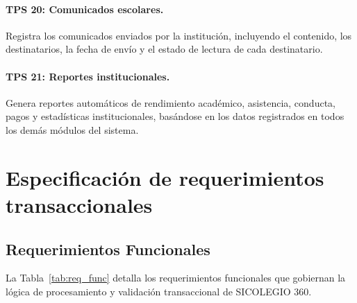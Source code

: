 \documentclass[12pt,a4paper,oneside]{report}
\begin{document}
\paragraph{TPS 20: Comunicados escolares.} Registra los comunicados enviados por la institución, incluyendo el contenido, los destinatarios, la fecha de envío y el estado de lectura de cada destinatario.

\paragraph{TPS 21: Reportes institucionales.} Genera reportes automáticos de rendimiento académico, asistencia, conducta, pagos y estadísticas institucionales, basándose en los datos registrados en todos los demás módulos del sistema.

\section{Especificación de requerimientos transaccionales}

\subsection{Requerimientos Funcionales}
La Tabla~\ref{tab:req_func} detalla los requerimientos funcionales que gobiernan la lógica de procesamiento y validación transaccional de SICOLEGIO 360.
\end{document}
